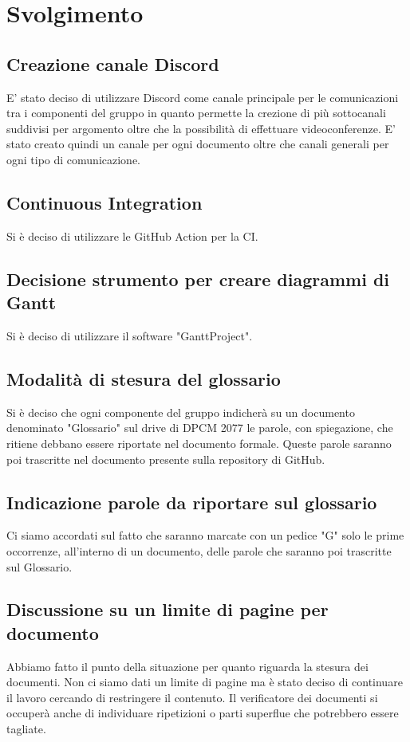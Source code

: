 \section*{Svolgimento}
\subsection*{Creazione canale Discord}
E' stato deciso di utilizzare Discord come canale principale per le comunicazioni tra i componenti del gruppo in quanto permette la crezione di più sottocanali suddivisi per argomento oltre che la possibilità di effettuare videoconferenze. E' stato creato quindi un canale per ogni documento oltre che canali generali per ogni tipo di comunicazione.

\subsection*{Continuous Integration}
Si è deciso di utilizzare le GitHub Action per la CI.

\subsection*{Decisione strumento per creare diagrammi di Gantt}
Si è deciso di utilizzare il software "GanttProject".
			
\subsection*{Modalità di stesura del glossario}
Si è deciso che ogni componente del gruppo indicherà su un documento denominato "Glossario" sul drive di DPCM 2077 le parole, con spiegazione, che ritiene debbano essere riportate nel documento formale. 
Queste parole saranno poi trascritte nel documento presente sulla repository di GitHub.

\subsection*{Indicazione parole da riportare sul glossario}
Ci siamo accordati sul fatto che saranno marcate con un pedice "G" solo le prime occorrenze, all'interno di un documento, delle parole che saranno poi trascritte sul Glossario.

\subsection*{Discussione su un limite di pagine per documento}
Abbiamo fatto il punto della situazione per quanto riguarda la stesura dei documenti. Non ci siamo dati un limite di pagine ma è stato deciso di continuare il lavoro cercando di restringere il contenuto. Il verificatore dei documenti si occuperà anche di individuare ripetizioni o parti superflue che potrebbero essere tagliate.

